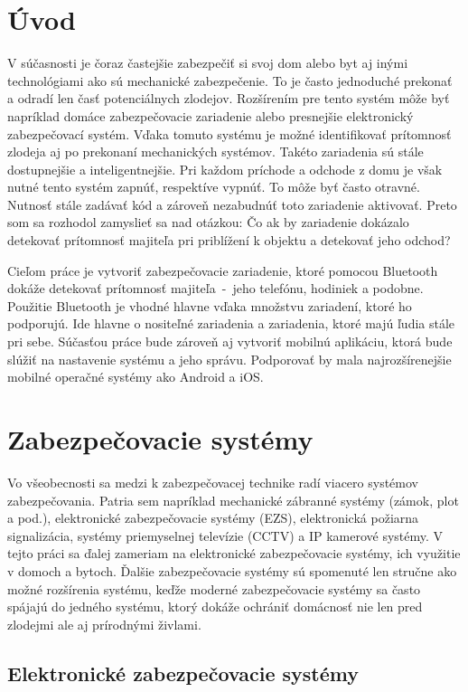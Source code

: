 \chapter{Úvod}

V súčasnosti je čoraz častejšie zabezpečiť si svoj dom alebo byt aj inými technológiami ako sú mechanické zabezpečenie. To je často jednoduché prekonať a odradí len časť potenciálnych zlodejov. Rozšírením pre tento systém môže byť napríklad domáce zabezpečovacie zariadenie alebo presnejšie elektronický zabezpečovací systém. Vďaka tomuto systému je možné identifikovať prítomnosť zlodeja aj po prekonaní mechanických systémov. Takéto zariadenia sú stále dostupnejšie a inteligentnejšie. Pri každom príchode a odchode z domu je však nutné tento systém zapnúť, respektíve vypnúť. To môže byť často otravné. Nutnosť stále zadávať kód a zároveň nezabudnúť toto zariadenie aktivovať. Preto som sa rozhodol zamyslieť sa nad otázkou: Čo ak by zariadenie dokázalo detekovať prítomnosť majiteľa pri priblížení k objektu a detekovať jeho odchod?

Cieľom práce je vytvoriť zabezpečovacie zariadenie, ktoré pomocou Bluetooth dokáže detekovať prítomnosť majiteľa~-~jeho telefónu, hodiniek a podobne. Použitie Bluetooth je vhodné hlavne vďaka množstvu zariadení, ktoré ho podporujú. Ide hlavne o nositeľné zariadenia a zariadenia, ktoré majú ľudia stále pri sebe.
Súčasťou práce bude zároveň aj vytvoriť mobilnú aplikáciu, ktorá bude slúžiť na nastavenie systému a jeho správu. Podporovať by mala najrozšírenejšie mobilné operačné systémy ako Android a iOS.

\chapter{Zabezpečovacie systémy}

Vo všeobecnosti sa medzi k zabezpečovacej technike radí viacero systémov zabezpečovania. Patria sem napríklad mechanické zábranné systémy (zámok, plot a pod.), elektronické zabezpečovacie systémy (EZS), elektronická požiarna signalizácia, systémy priemyselnej televízie (CCTV) a IP kamerové systémy. V tejto práci sa ďalej zameriam na elektronické zabezpečovacie systémy, ich využitie v domoch a bytoch. Ďalšie zabezpečovacie systémy sú spomenuté len stručne ako možné rozšírenia systému, keďže moderné zabezpečovacie systémy sa často spájajú do jedného systému, ktorý dokáže ochrániť domácnosť nie len pred zlodejmi ale aj prírodnými živlami.

\section{Elektronické zabezpečovacie systémy}

